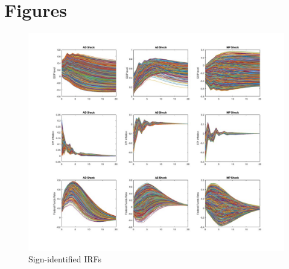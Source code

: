 \documentclass{article}
\begin{document}
\newpage

\section{Figures}
\begin{figure}[htbp]\caption[]{Sign-identified IRFs}\label{fig:signSVAR}
	\includegraphics[width=\textwidth]{../plots/signIRFs.jpg}
\end{figure}
\end{document}
